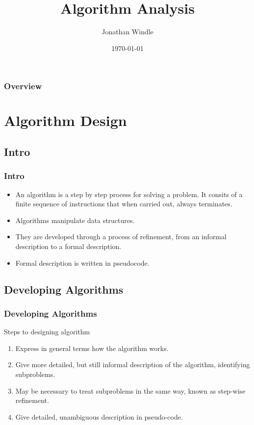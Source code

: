 \documentclass{beamer}
\title[Algorithm Analysis]{Algorithm Analysis} %
\author{Jonathan Windle} %
\institute[UEA] %
{
University of East Anglia \\ %
\medskip
\textit{J.Windle@uea.ac.uk} %
}
\date{\today} %
\begin{document}
\begin{frame}
\titlepage %
\end{frame}

\begin{frame}[allowframebreaks]
\frametitle{Overview} %
\tableofcontents %
\end{frame}

\section{Algorithm Design}
\subsection{Intro}
\begin{frame}
\frametitle{Intro}
\begin{itemize}
\item An algorithm is a step by step process for solving a problem. It consits of a finite sequence of instructions that when carried out, always terminates.
\item Algorithms manipulate data structures.
\item They are developed through a process of refinement, from an informal description to a formal description.
\item Formal description is written in pseudocode.
\end{itemize}
\end{frame}

\subsection{Developing Algorithms}
\begin{frame}
\frametitle{Developing Algorithms}
Steps to designing algorithm
\begin{enumerate}
\item Express in general terms how the algorithm works.
\item Give more detailed, but still informal description of the algorithm, identifying subproblems.
\item May be necessary to treat subproblems in the same way, known as {\color{green} step-wise refinement}.
\item Give detailed, unambiguous description in {\color{red}pseudo-code}.
\end{enumerate}
\end{frame}
\end{document}
